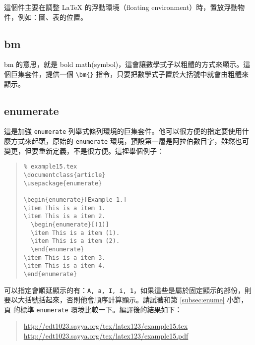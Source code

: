 這個件主要在調整 \LaTeX{} 的浮動環境（floating environment）時，置放浮動物件，例如：圖、表的位置。

\subsection{bm}

\textsf{bm} 的意思，就是 bold math(symbol)，這會讓數學式子以粗體的方式來顯示。這個巨集套件，提供一個 \verb|\bm{}| 指令，只要把數學式子置於大括號中就會由粗體來顯示。

\subsection{enumerate}
\label{subsec-enump}

這是加強 \texttt{enumerate} 列舉式條列環境的巨集套件。他可以很方便的指定要使用什麼方式來起頭，原始的 \texttt{enumerate} 環境，預設第一層是阿拉伯數目字，雖然也可變更，但要重新定義，不是很方便。這裡舉個例子：

\begin{quote}
  \begin{verbatim}
% example15.tex
\documentclass{article}
\usepackage{enumerate}

\begin{enumerate}[Example-1.]
\item This is a item 1.
\item This is a item 2.
  \begin{enumerate}[(1)]
  \item This is a item (1).
  \item This is a item (2).
  \end{enumerate}
\item This is a item 3.
\item This is a item 4.
\end{enumerate}

\end{verbatim}
\end{quote}

可以指定會順延顯示的有：\texttt{A, a, I, i, 1}，如果這些是屬於固定顯示的部份，則要以大括號括起來，否則他會順序計算顯示。請試著和第 \ref{subsec:enume} 小節，頁 \pageref{subsec:enume} 的標準 \texttt{enumerate} 環境比較一下。編譯後的結果如下：

\begin{quote}
  \url{http://edt1023.sayya.org/tex/latex123/example15.tex}\\
  \url{http://edt1023.sayya.org/tex/latex123/example15.pdf}
\end{quote}

